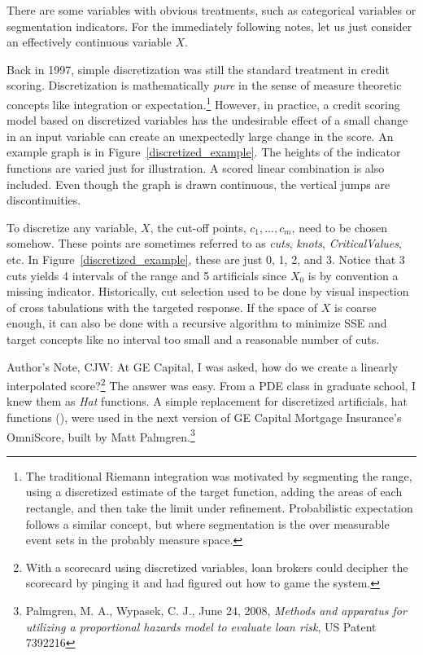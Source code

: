 \documentclass[10pt]{article}
\begin{document}
There are some variables with obvious treatments, such as categorical variables
or segmentation indicators.  For the immediately following notes, let us 
just consider an effectively continuous variable $X$.

Back in 1997, simple discretization was still the standard treatment in credit
scoring. Discretization is mathematically {\em pure} in the sense of measure 
theoretic concepts like integration or expectation.\footnote{The traditional
Riemann integration was motivated by segmenting the range, using a discretized
estimate of the target function, adding the areas of each rectangle, and then
take the limit under refinement. Probabilistic expectation follows a similar concept,
but where segmentation is the over measurable event sets in the probably measure space.}
However, in practice, a credit scoring model
based on discretized variables has the undesirable effect of a small change in
an input variable can create an unexpectedly large change in the score.  An example graph is
in Figure~\ref{discretized_example}. The heights of the indicator functions are
varied just for illustration. A scored linear combination is also included. Even
though the graph is drawn continuous, the vertical jumps are discontinuities.

To discretize any variable, $X$, the cut-off points, $c_1, \ldots, c_m$,  need to be chosen somehow. 
These points are sometimes referred to as {\em cuts}, {\em knots}, {\em CriticalValues}, etc.
In Figure~\ref{discretized_example}, these are just 0, 1, 2, and 3.  Notice that 3 cuts yields 4 
intervals of the range and 5 artificials since $X_0$ is by convention a missing indicator.
Historically, cut selection used to be done by visual inspection of cross tabulations with the 
targeted response.  If the space of $X$ is coarse enough, it can also be done with a 
recursive algorithm to minimize SSE and target concepts like no interval too small and a reasonable number of cuts.

Author's Note, CJW:
At GE Capital, I was asked, how do we create a linearly interpolated score?\footnote{With a scorecard using discretized variables,
loan brokers could decipher the scorecard by pinging it and had figured out how to game the system.}
The answer was easy.  From a PDE class in graduate school, I knew them as {\em
Hat} functions.  A simple replacement for discretized artificials, hat
functions (), were used in the next version of GE Capital Mortgage Insurance's OmniScore,
built by Matt Palmgren.\footnote{Palmgren, M. A., Wypasek, C. J., June 24, 2008, 
{\em Methods and apparatus for utilizing a proportional hazards model to evaluate loan risk}, US Patent 7392216}
\end{document}
